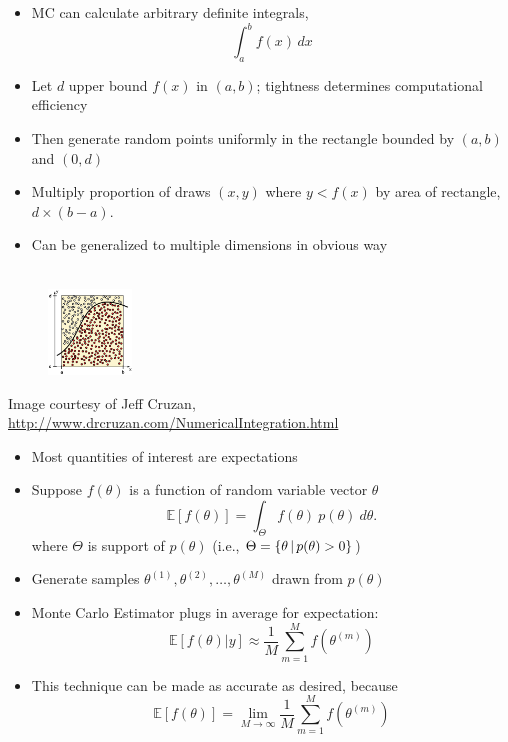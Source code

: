 \documentclass[10pt]{report}
\begin{document}
\begin{minipage}[t]{0.69\textwidth}
\vspace*{-0.1in}
\small
\begin{itemize}
\item MC can calculate arbitrary definite integrals,
\[
\int_a^b f(x) \, dx
\]
\item Let $d$ upper bound $f(x)$ in $(a,b)$;  tightness determines
computational efficiency
\item Then generate random points uniformly in the rectangle bounded by $(a,b)$ and $(0,d)$
\item Multiply proportion of draws $(x,y)$ where $y < f(x)$ by area of rectangle, $d \times (b-a)$.
\item Can be generalized to multiple dimensions in obvious way
\end{itemize}
\end{minipage}
\begin{minipage}[t]{0.29\textwidth}
\mbox{ } \\
\mbox{ } \ \ \ \ 
\includegraphics[height=0.9in]{img/monte-carlo-integration.png}
\end{minipage}
\vfill
\hfill
{\tiny Image courtesy of Jeff Cruzan, \url{http://www.drcruzan.com/NumericalIntegration.html}}

\begin{itemize}
\item Most quantities of interest are expectations
\item Suppose $f(\theta)$ is a function of random variable vector $\theta$
  \[
  \mathbb{E}[f(\theta)] = \int_{\Theta} f(\theta) \ p(\theta) \ d\theta.
  \]
where $\Theta$ is support of $p(\theta)$ (i.e., $\Theta =
\{ \theta \, | \, p(\theta) > 0 \}$)
\item Generate samples $\theta^{(1)}, \theta^{(2)}, \ldots,
  \theta^{(M)}$ drawn from $p(\theta)$
\item Monte Carlo Estimator plugs in average for expectation:
  \[
  \mathbb{E}[f(\theta)|y] \approx \frac{1}{M} \sum_{m=1}^M f(\theta^{(m)})
  \]
\item This technique can be made as accurate as desired, because
\[
\mathbb{E}[f(\theta)] 
= 
\lim_{M \rightarrow \infty}
\frac{1}{M} \sum_{m=1}^M f(\theta^{(m)})
\]
\end{itemize}
\end{document}
